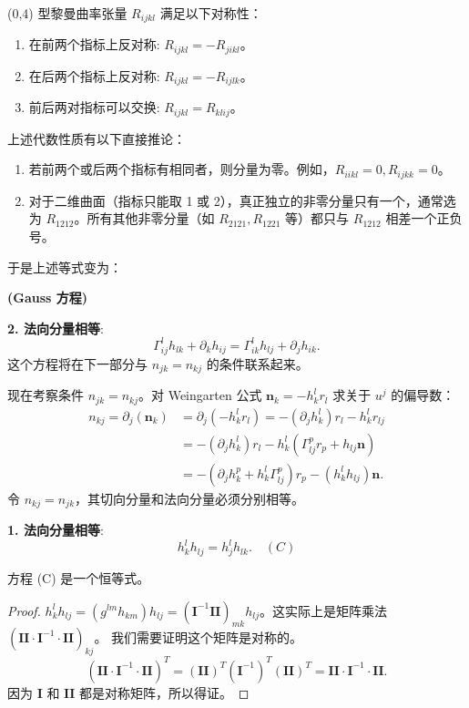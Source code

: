 \documentclass[lang=cn,10pt,thmcnt=section]{elegantbook}
\renewcommand{\vec}[1]{\mathbf{#1}}
\begin{document}
\begin{proposition}[黎曼曲率张量的代数性质]
    (0,4) 型黎曼曲率张量 $R_{ijkl}$ 满足以下对称性：
    \begin{enumerate}
        \item 在前两个指标上反对称: $R_{ijkl} = -R_{jikl}$。
        \item 在后两个指标上反对称: $R_{ijkl} = -R_{ijlk}$。
        \item 前后两对指标可以交换: $R_{ijkl} = R_{klij}$。
    \end{enumerate}
\end{proposition}

\begin{corollary}
    上述代数性质有以下直接推论：
    \begin{enumerate}
        \item 若前两个或后两个指标有相同者，则分量为零。例如，$R_{iikl}=0, R_{ijkk}=0$。
        \item 对于二维曲面（指标只能取 1 或 2），真正独立的非零分量只有一个，通常选为 $R_{1212}$。所有其他非零分量（如 $R_{2121}, R_{1221}$ 等）都只与 $R_{1212}$ 相差一个正负号。
    \end{enumerate}
\end{corollary}
于是上述等式变为：
\begin{center}
     \quad \textbf{(Gauss 方程)}
\end{center}

\textbf{2. 法向分量相等}:
\[
\Gamma_{ij}^l h_{lk} + \partial_k h_{ij} = \Gamma_{ik}^l h_{lj} + \partial_j h_{ik}.
\]
这个方程将在下一部分与 $n_{jk}=n_{kj}$ 的条件联系起来。

现在考察条件 $n_{jk} = n_{kj}$。对 Weingarten 公式 $\vec{n}_k = -h_k^l r_l$ 求关于 $u^j$ 的偏导数：
\begin{align*}
    n_{kj} = \partial_j (\vec{n}_k) &= \partial_j(-h_k^l r_l) = -(\partial_j h_k^l) r_l - h_k^l r_{lj} \\
    &= -(\partial_j h_k^l) r_l - h_k^l (\Gamma_{lj}^p r_p + h_{lj}\vec{n}) \\
    &= -(\partial_j h_k^p + h_k^l \Gamma_{lj}^p) r_p - (h_k^l h_{lj}) \vec{n}.
\end{align*}
令 $n_{kj}=n_{jk}$，其切向分量和法向分量必须分别相等。

\textbf{1. 法向分量相等}:
\[
h_k^l h_{lj} = h_j^l h_{lk}. \quad (C)
\]
\begin{proposition}
    方程 (C) 是一个恒等式。
\end{proposition}
\begin{proof}
    $h_k^l h_{lj} = (g^{lm}h_{km})h_{lj} = (\mathbf{I}^{-1}\mathbf{II})_{mk}h_{lj}$。这实际上是矩阵乘法 $(\mathbf{II} \cdot \mathbf{I}^{-1} \cdot \mathbf{II})_{kj}$。
    我们需要证明这个矩阵是对称的。
    \[
    (\mathbf{II} \cdot \mathbf{I}^{-1} \cdot \mathbf{II})^T = (\mathbf{II})^T (\mathbf{I}^{-1})^T (\mathbf{II})^T = \mathbf{II} \cdot \mathbf{I}^{-1} \cdot \mathbf{II}.
    \]
    因为 $\mathbf{I}$ 和 $\mathbf{II}$ 都是对称矩阵，所以得证。
\end{proof}
\end{document}
